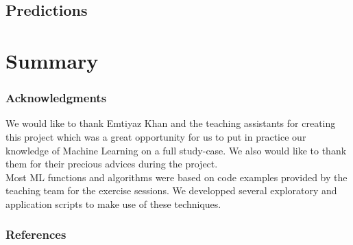 \documentclass{article} %
\begin{document}
  \subsection{Predictions}



\section{Summary}

\subsubsection*{Acknowledgments}
  We would like to thank Emtiyaz Khan and the teaching assistants for creating this project which was a great opportunity for us to put in practice our knowledge of Machine Learning on a full study-case. We also would like to thank them for their precious advices during the project.\\
  Most ML functions and algorithms were based on code examples provided by the teaching team for the exercise sessions. We developped several exploratory and application scripts to make use of these techniques.
\subsubsection*{References}
\end{document}
